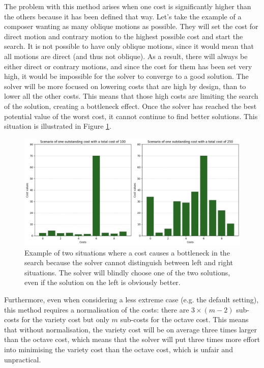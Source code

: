 The problem with this method arises when one cost is significantly higher than the others because it has been defined that way. Let's take the example of a composer wanting as many oblique motions as possible. They will set the cost for direct motion and contrary motion to the highest possible cost and start the search. It is not possible to have only oblique motions, since it would mean that all motions are direct (and thus not oblique). As a result, there will always be either direct or contrary motions, and since the cost for them has been set very high, it would be impossible for the solver to converge to a good solution. The solver will be more focused on lowering costs that are high by design, than to lower all the other costs. This means that those high costs are limiting the search of the solution, creating a bottleneck effect. Once the solver has reached the best potential value of the worst cost, it cannot continue to find better solutions. This situation is illustrated in Figure \ref{fig:bottleneck}.

\begin{figure}[h]
    \centering
    \includegraphics[width=1\textwidth]{Images/minimising-maxima.png}
    \caption{Example of two situations where a cost causes a bottleneck in the search because the solver cannot distinguish between left and right situations. The solver will blindly choose one of the two solutions, even if the solution on the left is obviously better.}
    \label{fig:bottleneck}
\end{figure}


Furthermore, even when considering a less extreme case (e.g. the default setting), this method requires a normalisation of the costs: there are $3\times (m-2)$ sub-costs for the variety cost but only $m$ sub-costs for the octave cost. This means that without normalisation, the variety cost will be on average three times larger than the octave cost, which means that the solver will put three times more effort into minimising the variety cost than the octave cost, which is unfair and unpractical.


